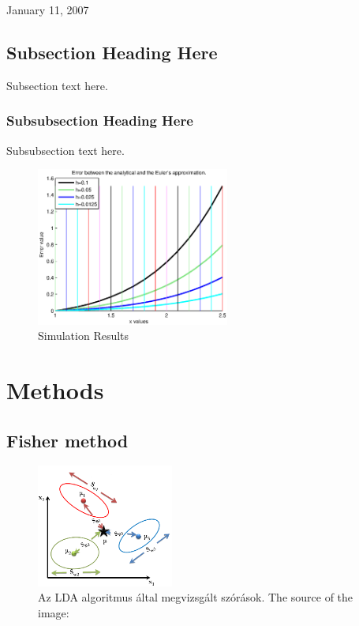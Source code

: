 \documentclass[journal]{IEEEtran}
\begin{document}
\hfill January 11, 2007

\subsection{Subsection Heading Here}
Subsection text here.

\subsubsection{Subsubsection Heading Here}
Subsubsection text here.



\begin{figure}[!t]
\centering
\includegraphics[width=2.5in]{rsrc/example.eps}
\caption{Simulation Results}
\label{fig_sim}
\end{figure}

\section {Methods}
\subsection{Fisher method}
\begin{figure}
	\centering		
	\includegraphics[width = 0.4\textwidth]{rsrc/LDA_basic.png}
	\caption{Az LDA algoritmus által megvizsgált szórások. The source of the image: \cite{LDA}}
	\label{fig:LDA abrazolas}
\end{figure}
\end{document}
